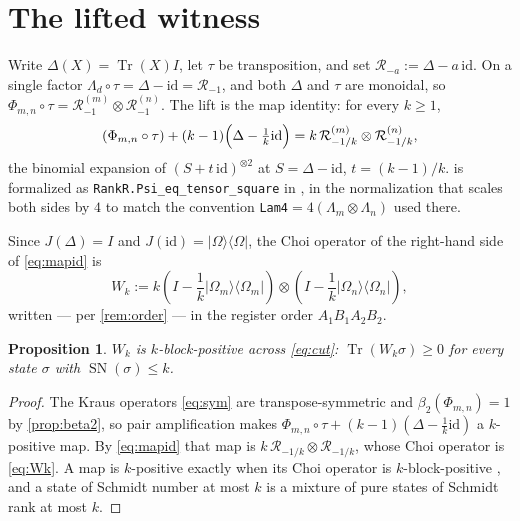\documentclass[11pt,reqno]{amsart}
\theoremstyle{plain}
\newtheorem{proposition}[theorem]{Proposition}
\theoremstyle{remark}
\DeclareMathOperator{\Tr}{Tr}
\DeclareMathOperator{\SN}{SN}
\newcommand{\cR}{\mathcal R}
\newcommand{\id}{\mathrm{id}}
\newcommand{\ketbra}[2]{\lvert #1\rangle\!\langle #2\rvert}
\begin{document}
\section{The lifted witness}

Write $\Delta(X)=\Tr(X)I$, let $\tau$ be transposition, and set
$\cR_{-a}:=\Delta-a\,\id$.  On a single factor
$\Lambda_d\circ\tau=\Delta-\id=\cR_{-1}$, and both $\Delta$ and $\tau$ are
monoidal, so $\Phi_{m,n}\circ\tau=\cR_{-1}^{(m)}\otimes\cR_{-1}^{(n)}$.  The
lift is the map identity: for every $k\ge1$,
\begin{equation}
\label{eq:mapid}
    (\Phi_{m,n}\circ\tau)
    +(k-1)\Bigl(\Delta-\tfrac1k\id\Bigr)
    =
    k\,\cR_{-1/k}^{(m)}\otimes\cR_{-1/k}^{(n)} ,
\end{equation}
the binomial expansion of $(S+t\,\id)^{\otimes2}$ at $S=\Delta-\id$,
$t=(k-1)/k$.   is formalized as
\texttt{RankR.Psi\_eq\_tensor\_square} in
, in the normalization that
scales both sides by $4$ to match the convention
\texttt{Lam4}${}=4(\Lambda_m\otimes\Lambda_n)$ used there.

Since $J(\Delta)=I$ and $J(\id)=\ketbra{\Omega}{\Omega}$, the Choi operator of
the right-hand side of \cref{eq:mapid} is
\begin{equation}
\label{eq:Wk}
    \boxed{\;
    W_k
    :=
    k\left(I-\frac1k\ketbra{\Omega_m}{\Omega_m}\right)
    \otimes
    \left(I-\frac1k\ketbra{\Omega_n}{\Omega_n}\right),
    \;}
\end{equation}
written --- per \cref{rem:order} --- in the register order $A_1B_1A_2B_2$.

\begin{proposition}
\label{prop:blockpos}
$W_k$ is $k$-block-positive across \cref{eq:cut}: $\Tr(W_k\sigma)\ge0$ for
every state $\sigma$ with $\SN(\sigma)\le k$.
\end{proposition}

\begin{proof}
The Kraus operators \cref{eq:sym} are transpose-symmetric and
$\beta_2(\Phi_{m,n})=1$ by \cref{prop:beta2}, so pair amplification makes
$\Phi_{m,n}\circ\tau+(k-1)(\Delta-\frac1k\id)$ a $k$-positive map.  By
\cref{eq:mapid} that map is $k\,\cR_{-1/k}\otimes\cR_{-1/k}$, whose Choi
operator is \cref{eq:Wk}.  A map is $k$-positive exactly when its Choi operator
is $k$-block-positive \cite{TerhalHorodecki2000}, and a state of Schmidt number
at most $k$ is a mixture of pure states of Schmidt rank at most $k$.
\end{proof}
\end{document}

